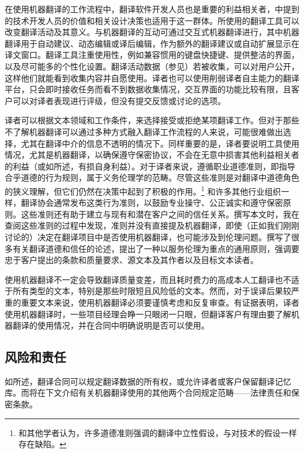 \documentclass[output=paper]{langscibook}
\begin{document}
在使用机器翻译的工作流程中，翻译软件开发人员也是重要的利益相关者，中提到的技术开发人员的价值和相关设计决策也适用于这一群体。所使用的翻译工具可以改变翻译活动及其意义。与机器翻译的互动可通过交互式机器翻译进行，其中机器翻译用于自动建议、动态编辑或译后编辑，作为额外的翻译建议或自动扩展显示在译文窗口。翻译工具注重使用性，例如兼容惯用的键盘快捷键、提供整洁的界面，以及尽可能多的个性化设置。翻译活动数据（参见）若被收集，可以对用户公开，这样他们就能看到收集内容并自愿使用。译者也可以使用削弱译者自主能力的翻译平台，只会即时接收任务而看不到数据收集情况，交互界面的功能比较有限，且客户可以对译者表现进行评级，但没有提交反馈或讨论的选项。

译者可以根据文本领域和工作条件，来选择接受或拒绝某项翻译工作。但对于那些不了解机器翻译可以通过多种方式融入翻译工作流程的人来说，可能很难做出选择，尤其在翻译中介的信息不透明的情况下。同样重要的是，译者要说明工具使用情况，尤其是机器翻译，以确保遵守保密协议，不会在无意中损害其他利益相关者的利益（或如所述，有损自身利益）。对于译者来说，遵循职业道德准则，即指导合乎道德的行为规则，属于义务伦理学的范畴。尽管这些准则是对翻译中道德角色的狭义理解，但它们仍然在决策中起到了积极的作用。\footnote{\citet{Lambert2018}和其他学者认为，许多道德准则强调的翻译中立性假设，与对技术的假设一样存在缺陷。} 和许多其他行业组织一样，翻译协会通常发布这类行为准则，以鼓励专业操守、公正诚实和遵守保密原则。这些准则还有助于建立与现有和潜在客户之间的信任关系。撰写本文时，我在查阅这些准则的过程中发现，准则并没有直接提及机器翻译，即使（正如我们刚刚讨论的）决定在翻译项目中是否使用机器翻译，也可能涉及到伦理问题。\citet{Chesterman2001}撰写了很多有关翻译道德和信任的论述，提出了一种以服务伦理为重点的通用原则，强调要忠于客户提出的条款和质量要求、源文本及其作者以及目标文本读者。

使用机器翻译不一定会导致翻译质量变差，而且耗时费力的高成本人工翻译也不适于所有类型的文本，特别是那些时限短且风险低的文本。然而，对于误译后果较严重的重要文本来说，使用机器翻译必须要谨慎考虑和反复审查。有证据表明，译者使用机器翻译时，一些项目经理会睁一只眼闭一只眼\citep{Sakamoto2019}，但翻译客户有理由要了解机器翻译的使用情况，并在合同中明确说明是否可以使用。


\subsection{风险和责任}\label{sec:moorkens:3.2}

如所述，翻译合同可以规定翻译数据的所有权，或允许译者或客户保留翻译记忆库。而\citet{CanforaOttmann2020}将在下文介绍有关机器翻译使用的其他两个合同规定范畴——法律责任和保密条款。
\end{document}
